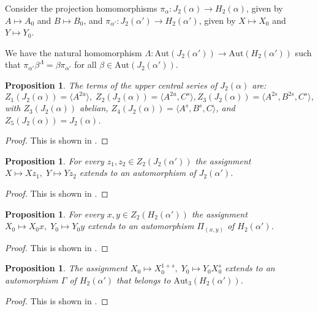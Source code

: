 \documentclass{amsart}
\newtheorem{prop}[theorem]{Proposition}
\theoremstyle{definition}
\theoremstyle{remark}
\begin{document}
Consider the projection homomorphisms $\pi_\alpha:J_2(\alpha)\to H_2(\alpha)$, given by $A\mapsto A_0$ and $B\mapsto B_0$,
and $\pi_{\alpha'}:J_2(\alpha')\to H_2(\alpha')$, given by $X\mapsto X_0$ and $Y\mapsto Y_0$.

We have the natural homomorphism $\Lambda:\mathrm{Aut}(J_2(\alpha'))\to \mathrm{Aut}(H_2(\alpha'))$ such that $\pi_{\alpha'} \beta^\Lambda=
\beta\pi_{\alpha'}$ for all $\beta\in \mathrm{Aut}(J_2(\alpha'))$.

\begin{prop}\label{cenj} The terms of the upper central series of $J_2(\alpha)$ are:
$$
    Z_1(J_2(\alpha))=\langle A^{{2u}}\rangle,\;
    Z_2(J_2(\alpha))=\langle  A^{{2u}},  C^{s}\rangle, Z_3(J_2(\alpha))=\langle A^{2s},  B^{2s}, C^{s}\rangle,
$$
with $Z_3(J_2(\alpha))$ abelian, $Z_4(J_2(\alpha))=\langle A^{s},  B^{s}, C\rangle$, and $Z_5(J_2(\alpha))=J_2(\alpha)$.
\end{prop}

\begin{proof} This is shown in \cite[Theorem 8.1 and Proposition 9.2]{MS}.
\end{proof}


\begin{prop}\label{autjo}
    For every $z_1,z_2\in Z_2(J_2(\alpha'))$ the assignment
    $X\mapsto Xz_1,\; Y\mapsto Yz_2$ extends to an automorphism of $J_2(\alpha')$.
\end{prop}

\begin{proof} This is shown in \cite[Proposition 7.2]{MS3}.
\end{proof}


\begin{prop}\label{auth}
    For every $x,y\in Z_2(H_2(\alpha'))$ the assignment $X_0\mapsto X_0x,\; Y_0\mapsto Y_0y$ extends to an automorphism
		$\Pi_{(x,y)}$ of $H_2(\alpha')$.
\end{prop}

\begin{proof} This is shown in \cite[Proposition 6.6]{MS3}.
\end{proof}

\begin{prop}\label{gamma} The assignment $X_0\mapsto X_0^{1+s},\; Y_0\mapsto Y_0X_0^s$ extends to an automorphism $\Gamma$ of
$H_2(\alpha')$ that belongs to $\mathrm{Aut}_3(H_2(\alpha'))$.
\end{prop}

\begin{proof} This is shown in \cite[Proposition 6.8]{MS3}.
\end{proof}
\end{document}
